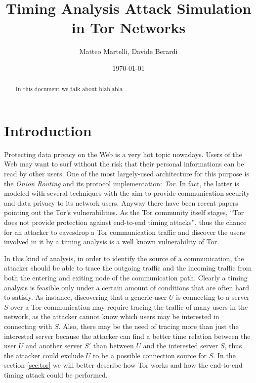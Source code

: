 \documentclass[a4paper]{article}
\title{Timing Analysis Attack Simulation in Tor Networks}
\author{Matteo Martelli, Davide Berardi}
\date{\today}
\begin{document}
\maketitle

\begin{abstract}
In this document we talk about blablabla
\end{abstract}

\section{Introduction}
Protecting data privacy on the Web is a very hot topic nowadays. 
Users of the Web may want to surf without the risk that their personal
informations can be read by other users. %
One of the most largely-used
architecture for this purpose is the \emph{Onion Routing} and its
protocol implementation: \emph{Tor}\cite{tor}. In fact, the latter is modeled with
several techniques with the aim to provide communication security and
data privacy to its network users. Anyway there have been recent papers
 pointing out the Tor's vulnerabilities. %
As the Tor community itself stages, ``Tor does not provide protection
against end-to-end timing attacks''\cite{tor-overview}, thus the
chance for an attacker to eavesdrop a Tor communication traffic and
discover the users involved in it by a
timing analysis is a well known vulnerability of Tor. 

In this kind of analysis, in order to
identify the source of a communication, the attacker should be able to
trace the outgoing traffic and the incoming traffic from both the
entering and exiting node of the communication path.
Clearly a timing analysis is feasible only under a certain amount of
conditions that are often hard to satisfy. As instance, discovering
that a generic user $U$ is connecting to a server $S$ over a Tor
communication may require tracing the traffic of many users in the
network, as the
attacker cannot know which users may be interested in connecting with
$S$. Also, there may be the need of tracing more than just the
interested server because the attacker can find a better time
relation between the user $U$ and another server $S'$ than between $U$
and the interested server $S$, thus the attacker could exclude $U$ to be a possible
connection source for $S$.
In the section
\ref{sec:tor} we will better describe how Tor works and how the
end-to-end timing attack could be performed.
\end{document}
